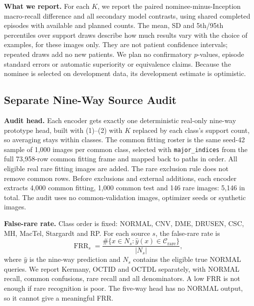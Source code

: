 \documentclass[conference]{IEEEtran}
\newcommand{\rare}{\mathcal{C}_{\mathrm{rare}}}
\newcommand{\claim}[1]{} %
\begin{document}
\claim{C22}
\textbf{What we report.} For each $K$, we report the paired nominee-minus-Inception macro-recall difference and all secondary model contrasts, using shared completed episodes with available and planned counts. The mean, SD and 5th/95th percentiles over support draws describe how much results vary with the choice of examples, for these images only. They are not patient confidence intervals; repeated draws add no new patients. We plan no confirmatory $p$-values, episode standard errors or automatic superiority or equivalence claims. Because the nominee is selected on development data, its development estimate is optimistic.

\subsection{Separate Nine-Way Source Audit}
\claim{C23}
\textbf{Audit head.} Each encoder gets exactly one deterministic real-only nine-way prototype head, built with (1)--(2) with $K$ replaced by each class's support count, so averaging stays within classes. The common fitting roster is the same seed-42 sample of 1,000 images per common class, selected with \texttt{major\_indices} from the full 73,958-row common fitting frame and mapped back to paths in order. All eligible real rare fitting images are added. The rare exclusion rule does not remove common rows. Before exclusions and external additions, each encoder extracts 4,000 common fitting, 1,000 common test and 146 rare images: 5,146 in total. The audit uses no common-validation images, optimizer seeds or synthetic images.

\claim{C24}
\textbf{False-rare rate.} Class order is fixed: NORMAL, CNV, DME, DRUSEN, CSC, MH, MacTel, Stargardt and RP. For each source $s$, the false-rare rate is
\begin{equation}
\operatorname{FRR}_s=
\frac{\#\{x\in N_s:\widehat y(x)\in\rare\}}{|N_s|},
\end{equation}
where $\widehat y$ is the nine-way prediction and $N_s$ contains the eligible true NORMAL queries. We report Kermany, OCTID \cite{OCTID2020} and OCTDL \cite{OCTDL2024} separately, with NORMAL recall, common confusions, rare recall and all denominators. A low FRR is not enough if rare recognition is poor. The five-way head has no NORMAL output, so it cannot give a meaningful FRR.
\end{document}
